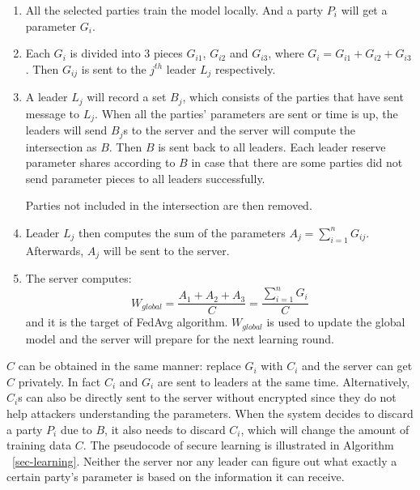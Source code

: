 \begin{enumerate}
    \item All the selected parties train the model locally. And a party $P_i$ will get a parameter $G_i$.
    
    \item Each $G_i$ is divided into 3 pieces $G_{i1}$, $G_{i2}$ and $G_{i3}$, where $G_i = G_{i1} + G_{i2} + G_{i3}$. Then $G_{ij}$ is sent to the $j^{th}$ leader $L_j$ respectively.
    
    \item A leader $L_j$ will record a set $B_j$, which consists of the parties that have sent message to $L_j$. When all the parties' parameters are sent or time is up, the leaders will send $B_j$s to the server and the server will compute the intersection as $B$. Then $B$ is sent back to all leaders. Each leader reserve parameter shares according to $B$ in case that there are some parties did not send parameter pieces to all leaders successfully. 

    Parties not included in the intersection are then removed. 

    \item Leader $L_j$ then computes the sum of the parameters $A_j = \sum_{i=1}^nG_{ij}$. Afterwards, $A_j$ will be sent to the server.

    \item The server computes: 
    $$W_{global} = \frac{A_1 + A_2 + A_3}{C}  = \frac{\sum_{i=1}^nG_i}{C} $$ 
    and it is the target of FedAvg algorithm. $W_{global}$ is used to update the global model and the server will prepare for the next learning round.
\end{enumerate}

$C$ can be obtained in the same manner: replace $G_i$ with $C_i$ and the server can get $C$ privately. In fact $C_i$ and $G_i$ are sent to leaders at the same time. Alternatively, $C_i$s can also be directly sent to the server without encrypted since they do not help attackers understanding the parameters. When the system decides to discard a party $P_i$ due to $B$, it also needs to discard $C_i$, which will change the amount of training data $C$. The pseudocode of secure learning is illustrated in Algorithm ~\ref{sec-learning}. Neither the server nor any leader can figure out what exactly a certain party's parameter is based on the information it can receive. 


